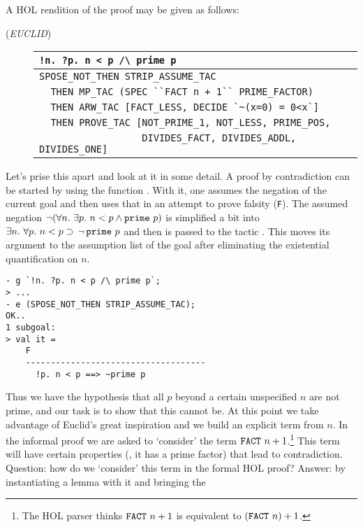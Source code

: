 A HOL rendition of the proof may be given as follows:
\begin{description}
\item [\small{({\it EUCLID\/})}]
\begin{tabular}[t]{l}
\verb+!n. ?p. n < p /\ prime p+ \\ \hline
\verb+SPOSE_NOT_THEN STRIP_ASSUME_TAC+ \\
\verb!  THEN MP_TAC (SPEC ``FACT n + 1`` PRIME_FACTOR)! \\
\verb+  THEN ARW_TAC [FACT_LESS, DECIDE `~(x=0) = 0<x`]+ \\
\verb+  THEN PROVE_TAC [NOT_PRIME_1, NOT_LESS, PRIME_POS, + \\
\verb+                  DIVIDES_FACT, DIVIDES_ADDL, DIVIDES_ONE]+ \\
\end{tabular}
\end{description}
Let's prise this apart and look at it in some detail. A proof by
contradiction can be started by using the  function
. With it, one assumes the negation of the
current goal and then uses that in an attempt to prove falsity
(\verb+F+). The assumed negation $\neg(\forall n.\ \exists p.\ n < p
\land \mbox{\tt prime}\ p)$ is simplified a bit into $\exists n.\
\forall p.\ n < p \supset \, \neg \,\mbox{\tt prime}\ p$ and then is
passed to the tactic \ml{STRIP\_ASSUME\_TAC}. This moves its argument
to the assumption list of the goal after eliminating the existential
quantification on $n$.
\begin{session}\begin{verbatim}
- g `!n. ?p. n < p /\ prime p`;
> ...
- e (SPOSE_NOT_THEN STRIP_ASSUME_TAC);
OK..
1 subgoal:
> val it =
    F
    ------------------------------------
      !p. n < p ==> ~prime p
\end{verbatim}\end{session}
Thus we have the hypothesis that all $p$ beyond a certain unspecified
$n$ are not prime, and our task is to show that this cannot be. At this
point we take advantage of Euclid's great inspiration and we build an
explicit term from $n$. In the informal proof we are asked to `consider'
the term $\mbox{\tt FACT}\ n + 1$.\footnote{The HOL parser thinks
$\mbox{\tt FACT}\ n + 1$ is equivalent to $(\mbox{\tt FACT}\ n) + 1$.}
This term will have certain properties (\ie, it has a prime factor) that
lead to contradiction. Question: how do we `consider' this term in the
formal HOL proof? Answer: by instantiating a lemma with it and bringing the
